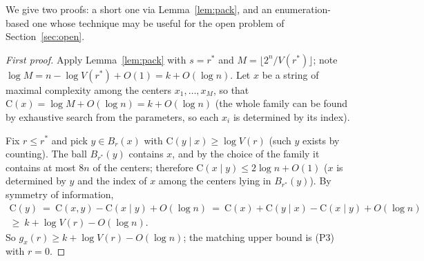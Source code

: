 \documentclass[11pt,a4paper]{article}
\theoremstyle{definition}
\newcommand{\C}{\mathrm{C}}
\renewcommand{\le}{\leqslant}
\renewcommand{\ge}{\geqslant}
\begin{document}
We give two proofs: a short one via Lemma~\ref{lem:pack}, and an
enumeration-based one whose technique may be useful for the open problem of
Section~\ref{sec:open}.

\begin{proof}[First proof]
Apply Lemma~\ref{lem:pack} with $s=r^*$ and $M=\lfloor2^n/V(r^*)\rfloor$; note
$\log M=n-\log V(r^*)+O(1)=k+O(\log n)$. Let $x$ be a string of maximal
complexity among the centers $x_1,\dots,x_M$, so that
$\C(x)=\log M+O(\log n)=k+O(\log n)$ (the whole family can be found by
exhaustive search from the parameters, so each $x_i$ is determined by its index).

Fix $r\le r^*$ and pick $y\in B_r(x)$ with $\C(y\mid x)\ge\log V(r)$ (such $y$
exists by counting). The ball $B_{r^*}(y)$ contains $x$, and by the choice of
the family it contains at most $8n$ of the centers; therefore $\C(x\mid
y)\le2\log n+O(1)$ ($x$ is determined by $y$ and the index of $x$ among the
centers lying in $B_{r^*}(y)$). By symmetry of information,
\begin{multline*}
  \C(y)\ =\ \C(x,y)-\C(x\mid y)+O(\log n)\ =\
  \C(x)+\C(y\mid x)-\C(x\mid y)+O(\log n)\\
  \ge\ k+\log V(r)-O(\log n).
\end{multline*}
So $g_x(r)\ge k+\log V(r)-O(\log n)$; the matching upper bound is (P3) with
$r=0$.
\end{proof}
\end{document}
